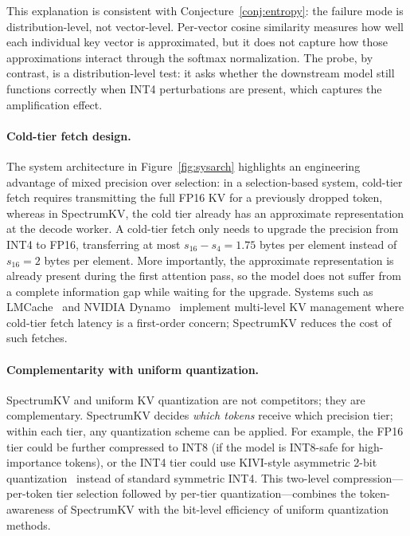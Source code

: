 \documentclass[11pt]{article}
\newcommand{\method}{SpectrumKV}
\theoremstyle{plain}
\theoremstyle{definition}
\begin{document}
This explanation is consistent with Conjecture~\ref{conj:entropy}: the failure mode is distribution-level, not vector-level.  Per-vector cosine similarity measures how well each individual key vector is approximated, but it does not capture how those approximations interact through the softmax normalization.  The probe, by contrast, is a distribution-level test: it asks whether the downstream model still functions correctly when INT4 perturbations are present, which captures the amplification effect.

\paragraph{Cold-tier fetch design.}
The system architecture in Figure~\ref{fig:sysarch} highlights an engineering advantage of mixed precision over selection: in a selection-based system, cold-tier fetch requires transmitting the full FP16 KV for a previously dropped token, whereas in \method{}, the cold tier already has an approximate representation at the decode worker.  A cold-tier fetch only needs to upgrade the precision from INT4 to FP16, transferring at most $s_{16} - s_4 = 1.75$ bytes per element instead of $s_{16} = 2$ bytes per element.  More importantly, the approximate representation is already present during the first attention pass, so the model does not suffer from a complete information gap while waiting for the upgrade.  Systems such as LMCache~\citep{lmcache} and NVIDIA Dynamo~\citep{nvidiadynamo} implement multi-level KV management where cold-tier fetch latency is a first-order concern; \method{} reduces the cost of such fetches.

\paragraph{Complementarity with uniform quantization.}
\method{} and uniform KV quantization are not competitors; they are complementary.  \method{} decides \emph{which tokens} receive which precision tier; within each tier, any quantization scheme can be applied.  For example, the FP16 tier could be further compressed to INT8 (if the model is INT8-safe for high-importance tokens), or the INT4 tier could use KIVI-style asymmetric 2-bit quantization~\citep{kivi} instead of standard symmetric INT4.  This two-level compression---per-token tier selection followed by per-tier quantization---combines the token-awareness of \method{} with the bit-level efficiency of uniform quantization methods.
\end{document}
